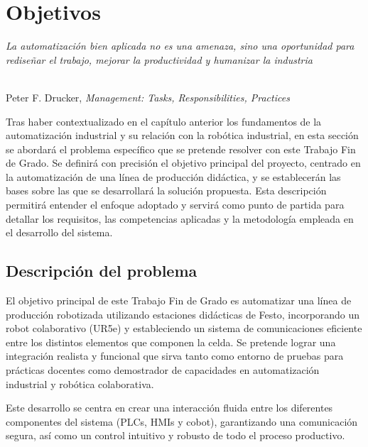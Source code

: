 \chapter{Objetivos}
\label{cap:capitulo2}

\begin{flushright}
\begin{minipage}[]{10cm}
\emph{La automatización bien aplicada no es una amenaza, sino una oportunidad para rediseñar el trabajo, mejorar la productividad y humanizar la industria}\\
\end{minipage}\\

Peter F. Drucker, \textit{ Management: Tasks, Responsibilities, Practices}\\
\end{flushright}

\vspace{1cm}

Tras haber contextualizado en el capítulo anterior los fundamentos de la automatización industrial y su relación con la robótica industrial, en esta sección se abordará el problema específico que se pretende resolver con este Trabajo Fin de Grado. Se definirá con precisión el objetivo principal del proyecto, centrado en la automatización de una línea de producción didáctica, y se establecerán las bases sobre las que se desarrollará la solución propuesta. Esta descripción permitirá entender el enfoque adoptado y servirá como punto de partida para detallar los requisitos, las competencias aplicadas y la metodología empleada en el desarrollo del sistema.

\section{Descripción del problema}
\label{sec:descripcion}

El objetivo principal de este Trabajo Fin de Grado es automatizar una línea de producción robotizada utilizando estaciones didácticas de Festo, incorporando un robot colaborativo (UR5e) y estableciendo un sistema de comunicaciones eficiente entre los distintos elementos que componen la celda. Se pretende lograr una integración realista y funcional que sirva tanto como entorno de pruebas para prácticas docentes como demostrador de capacidades en automatización industrial y robótica colaborativa.

Este desarrollo se centra en crear una interacción fluida entre los diferentes componentes del sistema (PLCs, HMIs y cobot), garantizando una comunicación segura, así como un control intuitivo y robusto de todo el proceso productivo.

